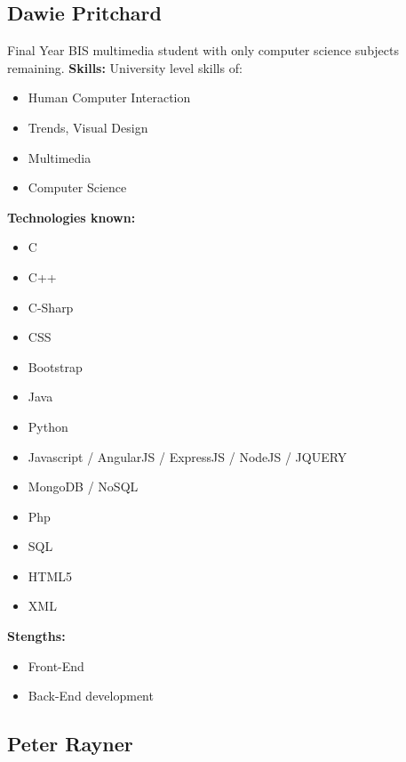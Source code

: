 \documentclass{article}
\begin{document}
\subsection{Dawie Pritchard}
Final Year BIS multimedia student with only computer science subjects remaining.
\textbf{Skills:}
University level skills of:
\begin{itemize}
 	\item Human Computer Interaction
 	\item Trends, Visual Design 
 	\item Multimedia
 	\item Computer Science
\end {itemize}
\textbf{Technologies known:}
\begin{itemize}
	\item C
 	\item C++
 	\item C-Sharp
 	\item CSS
 	\item Bootstrap
 	\item Java
 	\item Python
 	\item Javascript / AngularJS / ExpressJS / NodeJS / JQUERY
 	\item MongoDB / NoSQL
 	\item Php
 	\item SQL
 	\item HTML5
 	\item XML
 \end{itemize}
\textbf{Stengths:} 
\begin{itemize}
	\item Front-End
	\item Back-End development
\end{itemize}

\newpage
\subsection {Peter Rayner}
\end{document}
